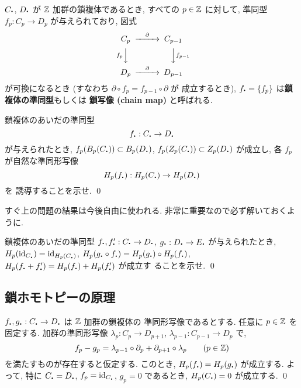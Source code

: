 \documentclass[12pt,twoside]{jarticle}
\begin{document}
$C_\bdot$, $D_\bdot$ が ${\mathbb Z}$ 加群の鎖複体であるとき, 
すべての $p\in{\mathbb Z}$ に対して, 準同型 $f_p:C_p\to D_p$ が与えられており, 図式
\[
\begin{CD}
  C_p        @>\partial>> C_{p-1} \\
  @V{f_p}VV               @VV{f_{p-1}}V \\
  D_p        @>\partial>> D_{p-1} \\
\end{CD}
\]
が可換になるとき (すなわち $\partial\circ f_p = f_{p-1}\circ\partial$ が
成立するとき), $f_\bdot = \{f_p\}$ は{\bf 鎖複体の準同型}もしくは
{\bf 鎖写像 (chain map)} と呼ばれる.

\begin{question}[鎖複体の準同型が誘導するホモロジー群の準同型]
  鎖複体のあいだの準同型
  \[ f_\bcdot : C_\bcdot \to D_\bcdot \]
  が与えられたとき, 
  $f_p(B_p(C_\bcdot)) \subset B_p(D_\bcdot)$, %
  $f_p(Z_p(C_\bcdot)) \subset Z_p(D_\bcdot)$ が成立し,
  各 $f_p$ が自然な準同形写像 %
  \[ H_p(f_\bcdot) : H_p(C_\bcdot) \to H_p(D_\bcdot) \] を
  誘導することを示せ.
  \qed
\end{question}

\noindent
すぐ上の問題の結果は今後自由に使われる.
非常に重要なので必ず解いておくように.

\begin{question}
  鎖複体のあいだの準同型 %
  $f_\bdot, f'_\bdot : C_\bdot\to D_\bdot$, %
  $g_\bdot : D_\bdot\to E_\bdot$ が与えられたとき, %
  $H_p(\id_{C_{\raise0.05ex\hbox{\bf.}}})
  =\id_{H_p(C_{\raise0.05ex\hbox{\bf.}})}$, %
  $H_p(g_\bcdot\circ f_\bcdot) = H_p(g_\bcdot)\circ H_p(f_\bcdot)$, %
  $H_p(f_\bcdot + f'_\bcdot) = H_p(f_\bcdot) + H_p(f'_\bcdot)$ が成立す
  ることを示せ. \qed
\end{question}


\subsection{鎖ホモトピーの原理}


\begin{question}[鎖ホモトピーの原理]\qstar{*}
  $f_\bcdot, g_\bcdot : C_\bcdot \to D_\bcdot$ は ${\mathbb Z}$ 加群の鎖複体の
  準同形写像であるとする. 任意に $p\in{\mathbb Z}$ を固定する. 
  加群の準同形写像 $\lambda_p : C_p \to D_{p+1}$, %
  $\lambda_{p-1}: C_{p-1} \to D_p$ で, 
  \[
    f_p - g_p = \lambda_{p-1}\circ \partial_p + \partial_{p+1} \circ \lambda_p
    \qquad (p\in{\mathbb Z})
  \] %
  を満たすものが存在すると仮定する. %
  このとき, $H_p(f_\bcdot) = H_p(g_\bcdot)$ が成立する. よって, 特に
  $C_\bcdot = D_\bcdot$, $f_p = \id_{C_{\raise0.05ex\hbox{\bf.}}}$,
  $g_p = 0$ であるとき, $H_p(C_\bcdot) = 0$ が成立する. \qed
\end{question}
\end{document}
